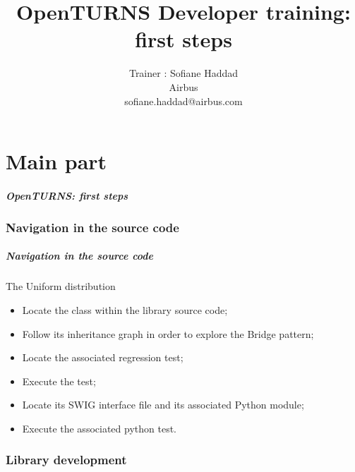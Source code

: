 \documentclass[8pt]{beamer}
\title[OpenTURNS Developer training]{OpenTURNS Developer training: first steps}
\author[OpenTURNS Consortium, 2019]
{
  Trainer : Sofiane Haddad \\
  Airbus \\
  sofiane.haddad@airbus.com
}
\date[May 14-17th 2019]
{
  Developers training \\

  \begin{center}
    \texttt{[image: logoOT.jpg]}
  \end{center}
}
\begin{document}
\frame{\titlepage}

\part{Main part}

\begin{frame}
  \frametitle{OpenTURNS: first steps}
  \tableofcontents[part=1]
\end{frame}

\section{Navigation in the source code}

\begin{frame}
  \frametitle{Navigation in the source code}
  \begin{block}{The Uniform distribution}
    \begin{itemize}
      \item Locate the class within the library source code;
      \item Follow its inheritance graph in order to explore the Bridge pattern;
      \item Locate the associated regression test;
      \item Execute the test;
      \item Locate its SWIG interface file and its associated Python module;
      \item Execute the associated python test.
    \end{itemize}
  \end{block}
\end{frame}


\section{Library development}
\end{document}
